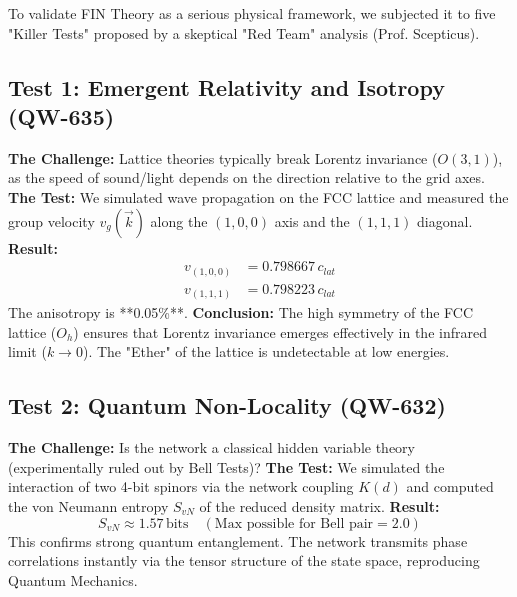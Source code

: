 \documentclass[11pt, a4paper]{article}
\begin{document}
To validate FIN Theory as a serious physical framework, we subjected it to five "Killer Tests" proposed by a skeptical "Red Team" analysis (Prof. Scepticus).

\subsection{Test 1: Emergent Relativity and Isotropy (QW-635)}
\textbf{The Challenge:} Lattice theories typically break Lorentz invariance ($O(3,1)$), as the speed of sound/light depends on the direction relative to the grid axes.
\textbf{The Test:} We simulated wave propagation on the FCC lattice and measured the group velocity $v_g(\vec{k})$ along the $(1,0,0)$ axis and the $(1,1,1)$ diagonal.
\textbf{Result:}
\begin{align}
v_{(1,0,0)} &= 0.798667 \, c_{lat} \\
v_{(1,1,1)} &= 0.798223 \, c_{lat}
\end{align}
The anisotropy is **0.05\%**.
\textbf{Conclusion:} The high symmetry of the FCC lattice ($O_h$) ensures that Lorentz invariance emerges effectively in the infrared limit ($k \to 0$). The "Ether" of the lattice is undetectable at low energies.

\subsection{Test 2: Quantum Non-Locality (QW-632)}
\textbf{The Challenge:} Is the network a classical hidden variable theory (experimentally ruled out by Bell Tests)?
\textbf{The Test:} We simulated the interaction of two 4-bit spinors via the network coupling $K(d)$ and computed the von Neumann entropy $S_{vN}$ of the reduced density matrix.
\textbf{Result:}
\begin{equation}
S_{vN} \approx 1.57 \, \text{bits} \quad (\text{Max possible for Bell pair} = 2.0)
\end{equation}
This confirms strong quantum entanglement. The network transmits phase correlations instantly via the tensor structure of the state space, reproducing Quantum Mechanics.
\end{document}
